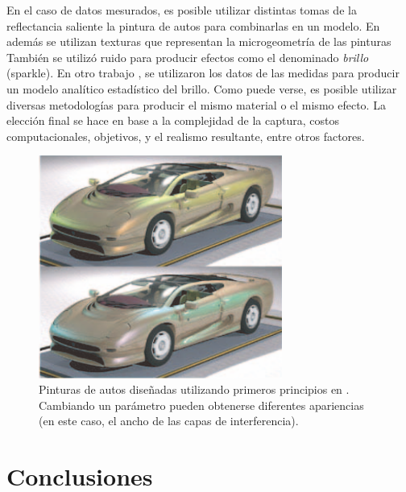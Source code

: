 En el caso de datos mesurados, es posible utilizar distintas tomas de la reflectancia saliente la pintura de autos para combinarlas en un modelo.
En \cite{Dumont2001} además se utilizan texturas que representan la microgeometría de las pinturas También se utilizó ruido para producir efectos como el denominado {\em brillo} (sparkle).
En otro trabajo \cite{Gunther2005}, se utilizaron los datos de las medidas para producir un modelo analítico estadístico del brillo.
Como puede verse, es posible utilizar diversas metodologías para producir el mismo material o el mismo efecto.
La elección final se hace en base a la complejidad de la captura, costos computacionales, objetivos, y el realismo resultante, entre otros factores.

\begin{figure}
\center
\includegraphics[width=8cm]{figures/pinturaauto}
\caption[Pinturas de autos diseñadas utilizando primeros principios]{Pinturas de autos diseñadas utilizando primeros principios en \cite{Ershov2001}. Cambiando un parámetro pueden obtenerse diferentes apariencias (en este caso, el ancho de las capas de interferencia).}
\label{fg:pinturaauto}
\end{figure}



\section{Conclusiones}

